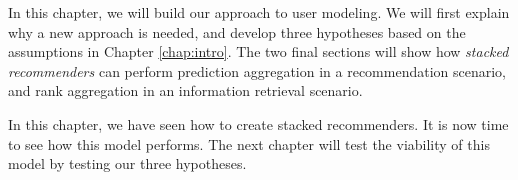 \label{chap:methods}

In this chapter, we will build our approach to user modeling.
We will first explain why a new approach is needed,
and develop three hypotheses based on the 
assumptions in Chapter \ref{chap:intro}.
The two final sections will show how \emph{stacked recommenders}
can perform prediction aggregation in a recommendation scenario,
and rank aggregation in an information retrieval scenario.







\hr

\noindent
In this chapter, we have seen how to create stacked recommenders.
It is now time to see how this model performs.
The next chapter will test the viability of this model
by testing our three hypotheses.
